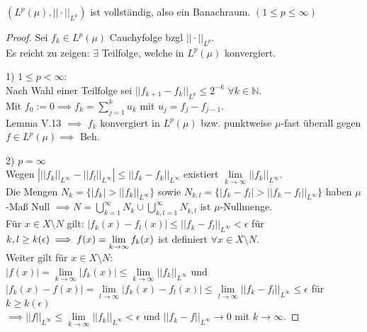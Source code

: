 
  \begin{theorem}
    $(L^p(\mu), ||\cdot||_{L^p})$ ist vollständig, also ein Banachraum. $(1 \leq p \leq \infty)$
  \end{theorem}

  \begin{proof}
    Sei $f_k \in L^p(\mu)$ Cauchyfolge bzgl $||\cdot ||_{L^p}$. \\
    Es reicht zu zeigen: $\exists$ Teilfolge, welche in $L^p(\mu)$ konvergiert.
    \item[1)] $1 \leq p < \infty$: \\
    Nach Wahl einer Teilfolge sei $||f_{k+1}-f_k||_{L^p} \leq 2^{-k}$ $\forall k\in\mathbb{N}$. \\
    Mit $f_0 := 0 \implies f_k = \sum\limits_{j=1}^k u_k$ mit $u_j = f_j - f_{j-1}$. \\
    Lemma V.13 $\implies$ $f_k$ konvergiert in $L^p(\mu)$ bzw. punktweise $\mu$-fast überall gegen $f\in L^p(\mu) \implies$ Beh.
    \item[2)] $p = \infty$ \\
    Wegen $\left| ||f_k||_{L^\infty} - ||f_l||_{L^\infty} \right| \leq ||f_k - f_k||_{L^\infty}$ existiert $\lim\limits_{k\to\infty} ||f_k||_{L^\infty}$. \\
    Die Mengen $N_k = \{|f_k| > ||f_k||_{L^\infty}  \}$ sowie $N_{k,l} = \{|f_k-f_l| > ||f_k-f_l||_{L^\infty} \}$ haben $\mu$-Maß Null $\implies N = \bigcup\limits_{k=1}^\infty N_k \cup \bigcup\limits_{k,l=1}^\infty N_{k,l}$ ist $\mu$-Nullmenge. \\
    Für $x\in X\setminus N$ gilt: $|f_k(x)-f_l(x)|\leq ||f_k-f_l||_{L^\infty} < \epsilon$ für $k,l \geq k(\epsilon) \\ 
    \implies f(x) = \lim\limits_{k\to\infty} f_k(x)$ ist definiert $\forall x\in X\setminus N$. \\
    Weiter gilt für $x\in X\setminus N$:\\
    $|f(x)| = \lim\limits_{k\to\infty}|f_k(x)| \leq \lim\limits_{k\to\infty} ||f_k||_{L^\infty}$ und $|f_k(x) - f(x)| = \lim\limits_{l\to\infty} |f_k(x)-f_l(x)| \leq \lim\limits_{l\to\infty} ||f_k-f_l||_{L^\infty} \leq \epsilon$ für $k\geq k(\epsilon)$ \\
    $\implies ||f||_{L^\infty} \leq \lim\limits_{k\to\infty} ||f_k||_{L^\infty} < \epsilon$ und $||f_k-f||_{L^\infty} \to 0$ mit $k\to\infty$.
  \end{proof}

